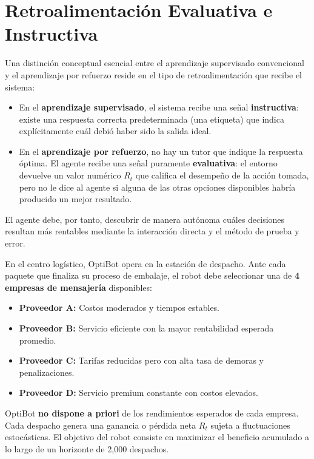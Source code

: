 \section{Retroalimentación Evaluativa e Instructiva}
Una distinción conceptual esencial entre el aprendizaje supervisado convencional y el aprendizaje por refuerzo reside en el tipo de retroalimentación que recibe el sistema:
\begin{itemize}
  \item En el \textbf{aprendizaje supervisado}, el sistema recibe una señal \textbf{instructiva}: existe una respuesta correcta predeterminada (una etiqueta) que indica explícitamente cuál debió haber sido la salida ideal.
  \item En el \textbf{aprendizaje por refuerzo}, no hay un tutor que indique la respuesta óptima. El agente recibe una señal puramente \textbf{evaluativa}: el entorno devuelve un valor numérico $R_t$ que califica el desempeño de la acción tomada, pero no le dice al agente si alguna de las otras opciones disponibles habría producido un mejor resultado.
\end{itemize}
El agente debe, por tanto, descubrir de manera autónoma cuáles decisiones resultan más rentables mediante la interacción directa y el método de prueba y error.

\begin{optibot}
En el centro logístico, OptiBot opera en la estación de despacho. Ante cada paquete que finaliza su proceso de embalaje, el robot debe seleccionar una de \textbf{4 empresas de mensajería} disponibles:
\begin{itemize}
  \item \textbf{Proveedor A:} Costos moderados y tiempos estables.
  \item \textbf{Proveedor B:} Servicio eficiente con la mayor rentabilidad esperada promedio.
  \item \textbf{Proveedor C:} Tarifas reducidas pero con alta tasa de demoras y penalizaciones.
  \item \textbf{Proveedor D:} Servicio premium constante con costos elevados.
\end{itemize}
OptiBot \textbf{no dispone a priori} de los rendimientos esperados de cada empresa. Cada despacho genera una ganancia o pérdida neta $R_t$ sujeta a fluctuaciones estocásticas. El objetivo del robot consiste en maximizar el beneficio acumulado a lo largo de un horizonte de 2,000 despachos.
\end{optibot}

